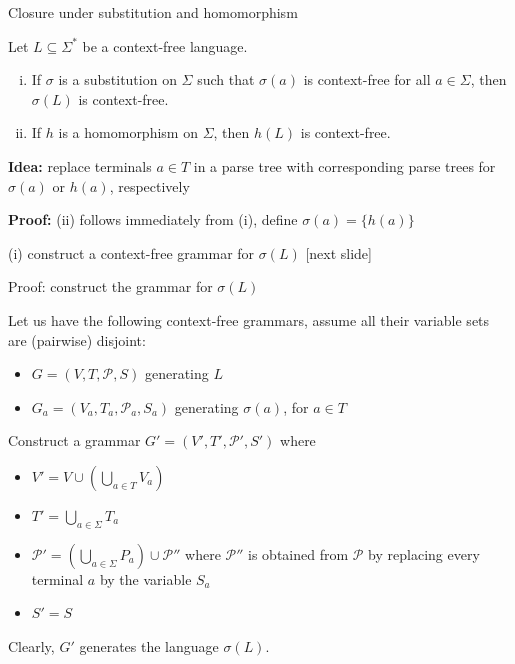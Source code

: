 \documentclass[handout]{beamer}
\begin{document}
\begin{frame}{Closure under substitution and homomorphism}
   
    \begin{theorem}
        Let $L\subseteq\Sigma^*$ be a context-free language.
        \begin{enumerate}[(i)]
            \item If $\sigma$ is a substitution on $\Sigma$ such that $\sigma(a)$ is context-free for all $a\in \Sigma$, then $\sigma(L)$ is context-free.
            \item If $h$ is a homomorphism on $\Sigma$, then $h(L)$ is context-free.
        \end{enumerate}   
    \end{theorem}

    \textbf{Idea:} replace terminals $a\in T$ in a parse tree with corresponding  parse trees for $\sigma(a)$ or $h(a)$, respectively

    \vspace{-12pt}
    \begin{multicols}{2}

        \phantom{.}

        \textbf{Proof:} \alert{(ii)} follows immediately from (i), define $\sigma(a)=\{h(a)\}$

        \alert{(i)} construct a context-free grammar for $\sigma(L)$ [next slide]

        
        \begin{center}
            \scalebox{1}{
                        
            }
        \end{center}

    \end{multicols}
    
\end{frame}


\begin{frame}{Proof: construct the grammar for $\sigma(L)$}

    Let us have the following context-free grammars, assume all their variable sets are (pairwise) disjoint:
    \begin{itemize}
        \item $G=(V,T,\mathcal P,S)$ generating $L$
        \item $G_a=(V_a,T_a,\mathcal P_a,S_a)$ generating $\sigma(a)$, for $a\in T$
    \end{itemize} 

    Construct a grammar $G'=(V',T',\mathcal P',S')$ where
    \begin{itemize}
        \item $V'=V\cup (\bigcup_{a\in T} V_a)$
	    \item $T'=\bigcup_{a\in \Sigma} T_a$
	    \item $\mathcal P'=(\bigcup_{a\in \Sigma} P_a) \cup \mathcal P''$ where $\mathcal P''$ is obtained from $\mathcal P$ by replacing every terminal $a$ by the variable $S_a$
	    \item $S'=S$
    \end{itemize}
    Clearly, $G'$ generates the language $\sigma(L)$.
    \hfill\qedsymbol

\end{frame}
\end{document}

